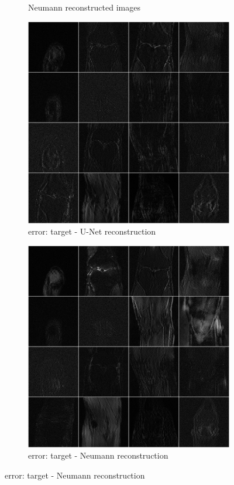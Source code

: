 \documentclass{article}
\begin{document}
\begin{figure}[H]
\begin{subfigure}[]{.5\textwidth}
	\caption{Neumann reconstructed images}
	\vspace*{2mm}
    \end{subfigure}%
  \hspace{4pt}%
   \begin{subfigure}[]{.5\textwidth}
   \centering   
        \includegraphics[width=.95\linewidth]{Unet_error}
        \caption{error: target - U-Net reconstruction }
        \label{fig:reconstructed_images}
    \end{subfigure}%
   \begin{subfigure}[]{.5\textwidth}
   \centering   
        \includegraphics[width=.95\linewidth]{neumann_error}
        \caption{error: target - Neumann reconstruction }
    \end{subfigure}%
\end{figure}
\end{document}
